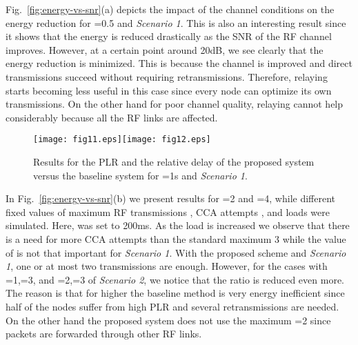 \documentclass[10pt]{IEEEtran}
\begin{document}
Fig.~\ref{fig:energy-vs-snr}(a) depicts the impact of the channel conditions on the energy reduction for =0.5 and \emph{Scenario 1}. This is also an interesting result since it shows that the energy is reduced drastically as the SNR of the RF channel improves. However, at a certain point around 20dB, we see clearly that the energy reduction is minimized. This is because the channel is improved and direct transmissions succeed without requiring retransmissions. Therefore, relaying starts becoming less useful in this case since every node can optimize its own transmissions. On the other hand for poor channel quality, relaying cannot help considerably because all the RF links are affected.






\begin{figure}[t]
\begin{center}
\texttt{[image: fig11.eps]}\hspace{-0.2cm}\texttt{[image: fig12.eps]}
\caption{Results for the PLR and the relative delay of the proposed system versus the baseline system for =1s and \emph{Scenario 1}.}
  \label{fig:latency-vs-load}
\end{center}
\end{figure}

In Fig.~\ref{fig:energy-vs-snr}(b) we present results for =2 and =4, while different fixed values of maximum RF transmissions , CCA attempts , and loads were simulated. Here,  was set to 200ms. As the load is increased we observe that there is a need for more CCA attempts than the standard maximum 3 while the value of  is not that important for \emph{Scenario 1}. With the proposed scheme and \emph{Scenario 1}, one or at most two transmissions are enough. However, for the cases with =1,=3, and =2,=3 of \emph{Scenario 2}, we notice that the ratio is reduced even more. The reason is that for higher  the baseline method is very energy inefficient since half of the nodes suffer from high PLR and several retransmissions are needed. On the other hand the proposed system does not use the maximum =2 since packets are forwarded through other RF links.
\end{document}
